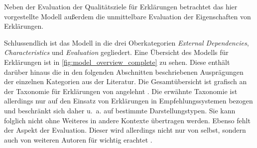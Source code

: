 Neben der Evaluation der Qualitätsziele für Erklärungen betrachtet das hier vorgestellte Modell außerdem die unmittelbare Evaluation der Eigenschaften von Erklärungen. 

\smallbreak

Schlussendlich ist das Modell in die drei Oberkategorien \textit{External Dependencies}, \textit{Characteristics} und \textit{Evaluation} gegliedert. Eine Übersicht des Modells für Erklärungen ist in \autoref{fig:model_overview_complete} zu sehen. Diese enthält darüber hinaus die in den folgenden Abschnitten beschriebenen Ausprägungen der einzelnen Kategorien aus der Literatur. Die Gesamtübersicht ist grafisch an der Taxonomie für Erklärungen von \citeauthor{nunes_systematic_2017} angelehnt \cite{nunes_systematic_2017}. Die erwähnte Taxonomie ist allerdings nur auf den Einsatz von Erklärungen in Empfehlungssystemen bezogen und beschränkt sich daher u.~a. auf bestimmte Darstellungstypen. Sie kann folglich nicht ohne Weiteres in andere Kontexte übertragen werden. Ebenso fehlt der Aspekt der Evaluation. Dieser wird allerdings nicht nur von \citeauthor{nunes_systematic_2017} selbst, sondern auch von weiteren Autoren für wichtig erachtet \cite{cirqueira_scenario-based_2020, martin_evaluating_2021,nunes_systematic_2017}.

\newpage
\null
\vfill

